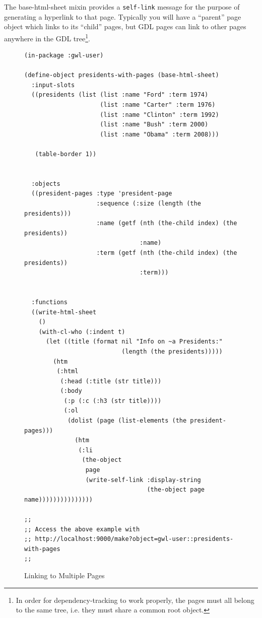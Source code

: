 \documentclass [11pt]{book}
\begin{document}
The base-html-sheet mixin provides a \texttt{self-link} message for the purpose of generating a hyperlink to that
page. Typically you will have a ``parent'' page object which links to
its ``child'' pages, but GDL pages can link to other pages anywhere
in the GDL tree\footnote{In order for dependency-tracking to work
properly, the pages must all belong to the same tree, i.e. they must
share a common root object.}.
\begin{figure}
\begin{lrbox}{\boxedverb}
\begin{minipage}{\linewidth}
{\small

\begin{verbatim}(in-package :gwl-user)

(define-object presidents-with-pages (base-html-sheet)
  :input-slots
  ((presidents (list (list :name "Ford" :term 1974)
                     (list :name "Carter" :term 1976)
                     (list :name "Clinton" :term 1992)
                     (list :name "Bush" :term 2000)
                     (list :name "Obama" :term 2008)))
   
   (table-border 1))
  
  
  :objects
  ((president-pages :type 'president-page
                    :sequence (:size (length (the presidents)))
                    :name (getf (nth (the-child index) (the presidents))
                                :name)
                    :term (getf (nth (the-child index) (the presidents))
                                :term)))


  :functions
  ((write-html-sheet
    () 
    (with-cl-who (:indent t)
      (let ((title (format nil "Info on ~a Presidents:" 
                           (length (the presidents)))))
        (htm
         (:html 
          (:head (:title (str title)))
          (:body 
           (:p (:c (:h3 (str title))))
           (:ol
            (dolist (page (list-elements (the president-pages)))
              (htm      
               (:li
                (the-object 
                 page 
                 (write-self-link :display-string 
                                  (the-object page name)))))))))))))))

;;
;; Access the above example with 
;; http://localhost:9000/make?object=gwl-user::presidents-with-pages
;;

\end{verbatim}}
\end{minipage}
\end{lrbox}
\fbox{\usebox{\boxedverb}}

\caption{Linking to Multiple Pages}

\label{fig:gwl-3}

\end{figure}
\end{document}
